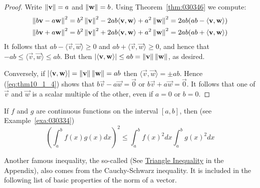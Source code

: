 \documentclass{ximera}
\begin{document}
\begin{proof}
Write $\left\lVert\mathbf{v}\right\rVert = a$ and $\left\lVert\mathbf{w}\right\rVert = b$. Using Theorem~\ref{thm:030346} we compute:
\begin{equation}
\label{eq:thm10_1_4}
\begin{split}
	\left\lVert b\mathbf{v} - a \mathbf{w} \right\rVert^2 &= b^2 \left\lVert \mathbf{v} \right\rVert^2 - 2ab \langle \mathbf{v}, \mathbf{w} \rangle + a^2\left\lVert \mathbf{w} \right\rVert^2 = 2ab(ab - \langle \mathbf{v}, \mathbf{w} \rangle) \\
	\left\lVert b\mathbf{v} + a \mathbf{w} \right\rVert^2 &= b^2 \left\lVert \mathbf{v} \right\rVert^2 + 2ab \langle \mathbf{v}, \mathbf{w} \rangle + a^2\left\lVert \mathbf{w} \right\rVert^2 = 2ab(ab + \langle \mathbf{v}, \mathbf{w} \rangle) \\
\end{split}
\end{equation}
It follows that $ab - \langle\vec{v}, \vec{w}\rangle \geq 0$ and
$ab + \langle\vec{v}, \vec{w}\rangle \geq 0$, and hence that $-ab \leq \langle\vec{v}, \vec{w}\rangle \leq ab$. But then $| \langle\mathbf{v}, \mathbf{w}\rangle | \leq ab = \left\lVert\mathbf{v}\right\rVert \left\lVert \mathbf{w}\right\rVert$, as desired.

Conversely, if $|\langle \mathbf{v},  \mathbf{w}\rangle | =
\left\lVert\mathbf{v}\right\rVert \left\lVert \mathbf{w} \right\rVert = ab$
then $\langle\vec{v}, \vec{w}\rangle = \pm ab$. Hence (\ref{eq:thm10_1_4}) shows that $b\vec{v} - a\vec{w} = \vec{0}$ or $b\vec{v} + a\vec{w} = \vec{0}$. It follows that one of $\vec{v}$ and $\vec{w}$ is a scalar multiple of the other, even if $a = 0$ or $b = 0$.
\end{proof}

\begin{example}\label{030499}
If $f$ and $g$ are continuous functions on the interval $[a, b]$, then (see Example~\ref{exa:030334})
\begin{equation*}
\left(\int_{a}^{b} f(x)g(x)dx \right) ^2 \leq \int_{a}^{b} f(x)^2 dx \int_{a}^{b} g(x)^2 dx
\end{equation*}
\end{example}

Another famous inequality, the so-called  (See \href{https://ximera.osu.edu/oerlinalg/LinearAlgebra/APX-0010/main}{Triangle Inequality} in the Appendix), also comes from the Cauchy-Schwarz inequality. It is included in the following list of basic properties of the norm of a vector.
\end{document}
